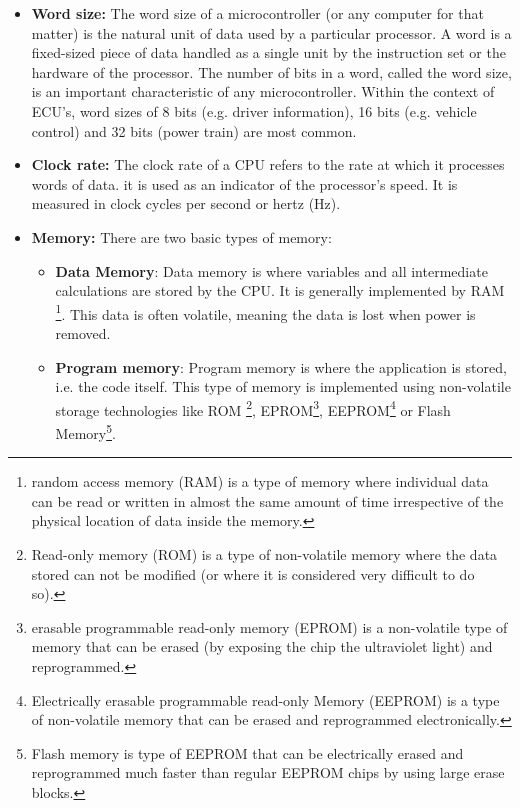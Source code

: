 \begin{itemize}
	\item \textbf{Word size:} The word size of a microcontroller (or any computer for that matter) is the natural unit of data used by a particular processor. A word is a fixed-sized piece of data handled as a single unit by the instruction set or the hardware of the processor. The number of bits in a word, called the word size, is an important characteristic of any microcontroller. Within the context of ECU's, word sizes of 8 bits (e.g. driver information), 16 bits (e.g. vehicle control) and 32 bits (power train) are most common. \cite{ECU}
	
	\item \textbf{Clock rate:} The clock rate of a CPU refers to the rate at which it processes words of data. it is used as an indicator of the processor's speed. It is measured in clock cycles per second or hertz (Hz). 
	
	\item \textbf{Memory:} There are two basic types of memory: 
	\begin{itemize}
		\item \textbf{Data Memory}: Data memory is where variables and all intermediate calculations are stored by the CPU. It is generally implemented by RAM \footnote{random access memory (RAM) is a type of memory where individual data can be read or written in almost the same amount of time irrespective of the physical location of data inside the memory.}. This data is often volatile, meaning the data is lost when power is removed.
		
		\item \textbf{Program memory}: Program memory is where the application is stored, i.e. the code itself. This type of memory is implemented using non-volatile storage technologies like ROM \footnote{Read-only memory (ROM) is a type of non-volatile memory where the data stored can not be modified (or where it is considered very difficult to do so).}, EPROM\footnote{erasable programmable read-only memory (EPROM) is a non-volatile type of memory that can be erased (by exposing the chip the ultraviolet light) and reprogrammed.}, EEPROM\footnote{Electrically erasable programmable read-only Memory (EEPROM) is a type of non-volatile memory that can be erased and reprogrammed electronically.} or Flash Memory\footnote{Flash memory is type of EEPROM  that can be electrically erased and reprogrammed much faster than regular EEPROM chips by using large erase blocks.}.
	\end{itemize}
	

\end{itemize}
